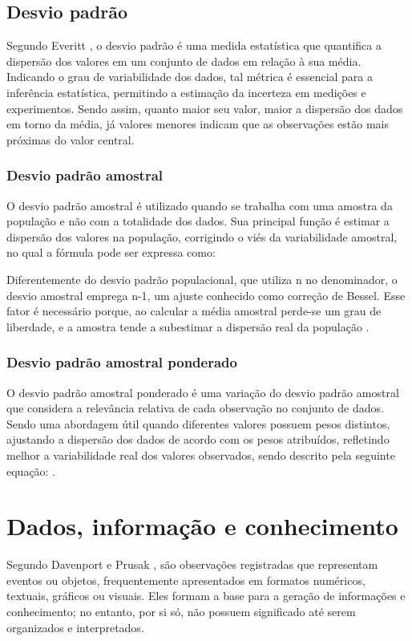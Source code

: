 \subsection{Desvio padrão}
Segundo Everitt \cite{everitt2002cambridge}, o desvio padrão é uma medida estatística que quantifica a dispersão dos valores em um conjunto de dados em relação à sua média. Indicando o grau de variabilidade dos dados, tal métrica é essencial para a inferência estatística, permitindo a estimação da incerteza em medições e experimentos. Sendo assim, quanto maior seu valor, maior a dispersão dos dados em torno da média, já valores menores indicam que as observações estão mais próximas do valor central.

\subsubsection{Desvio padrão amostral}
O desvio padrão amostral é utilizado quando se trabalha com uma amostra da população e não com a totalidade dos dados. Sua principal função é estimar a dispersão dos valores na população, corrigindo o viés da variabilidade amostral, no qual a fórmula pode ser expressa como:

Diferentemente do desvio padrão populacional, que utiliza n no denominador, o desvio amostral emprega n-1, um ajuste conhecido como correção de Bessel. Esse fator é necessário porque, ao calcular a média amostral perde-se um grau de liberdade, e a amostra tende a subestimar a dispersão real da população \cite{taylor1994nist}.

\subsubsection{Desvio padrão amostral ponderado}
O desvio padrão amostral ponderado é uma variação do desvio padrão amostral que considera a relevância relativa de cada observação no conjunto de dados. Sendo uma abordagem útil quando diferentes valores possuem pesos distintos,  ajustando a dispersão dos dados de acordo com os pesos atribuídos, refletindo melhor a variabilidade real dos valores observados, sendo descrito pela seguinte equação: \cite{hastie2009elements}.



\section{Dados, informação e conhecimento}
Segundo Davenport e Prusak \cite{davenport1998working},  são observações registradas que representam eventos ou objetos, frequentemente apresentados em formatos numéricos, textuais, gráficos ou visuais. Eles formam a base para a geração de informações e conhecimento; no entanto, por si só, não possuem significado até serem organizados e interpretados.

